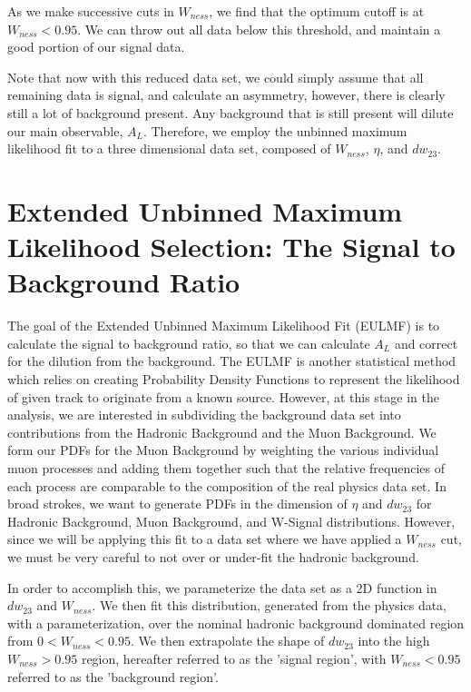 As we make successive cuts in $W_{ness}$, we find that the optimum cutoff is at
$W_{ness} < 0.95$. We can throw out all data below this threshold, and
maintain a good portion of our signal data.

Note that now with this reduced data set, we could simply assume that all
remaining data is signal, and calculate an asymmetry, however, there is clearly
still a lot of background present. Any background that is still present will
dilute our main observable, $A_L$. Therefore, we employ the unbinned maximum
likelihood fit to a three dimensional data set, composed of $W_{ness}$, $\eta$,
and $dw_{23}$.

\clearpage
\section{Extended Unbinned Maximum Likelihood Selection: The Signal to
Background Ratio}
\label{sec:sbr}

The goal of the Extended Unbinned Maximum Likelihood Fit (EULMF) is to calculate
the signal to background ratio, so that we can calculate $A_L$ and correct for
the dilution from the background. The EULMF is another statistical method which
relies on creating Probability Density Functions to represent the likelihood of
given track to originate from a known source. However, at this stage in the
analysis, we are interested in subdividing the background data set into
contributions from the Hadronic Background and the Muon Background. We form our
PDFs for the Muon Background by weighting the various individual muon
processes and adding them together such that the relative frequencies of each
process are comparable to the composition of the real physics data set. In broad
strokes, we want to generate PDFs in the dimension of $\eta$ and $dw_{23}$ for
Hadronic Background, Muon Background, and W-Signal distributions. However, since
we will be applying this fit to a data set where we have applied a $W_{ness}$
cut, we must be very careful to not over or under-fit the hadronic background. 

In order to accomplish this, we parameterize the data set as a 2D function in
$dw_{23}$ and $W_{ness}$. We then fit this distribution, generated from the
physics data, with a parameterization, over the nominal hadronic background
dominated region from $0 < W_{ness} < 0.95$. We then extrapolate the shape
of $dw_{23}$ into the high $W_{ness} > 0.95$ region, hereafter referred to as
the 'signal region', with $W_{ness} < 0.95$ referred to as the 'background
region'.

